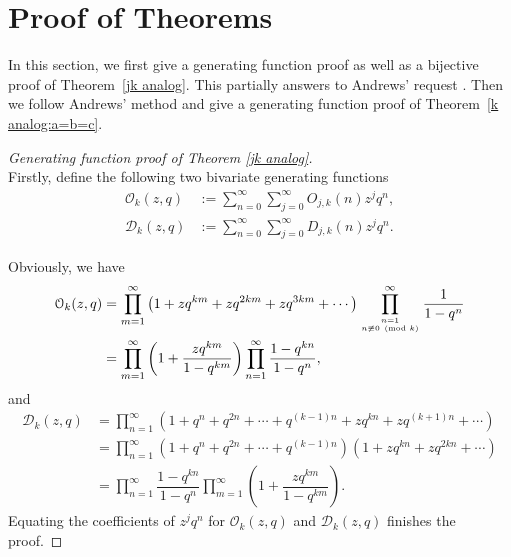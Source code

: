\documentclass[12pt]{amsart}
\numberwithin{equation}{section}
\theoremstyle{plain}
\theoremstyle{definition}
\begin{document}
\section{Proof of Theorems}
In this section, we first give a generating function proof as well as a bijective proof of Theorem~\ref{jk analog}. This partially answers to Andrews' request \cite{Andr2}. Then we follow Andrews' method and give a generating function proof of Theorem~\ref{k analog:a=b=c}.

\begin{proof}[Generating function proof of Theorem \ref{jk analog}]\ \\
Firstly, define the following two bivariate generating functions
\begin{align*}
\mathcal{O}_{k}(z,q) &:=\sum_{n=0}^{\infty}\sum_{j=0}^{\infty}O_{j,k}(n)z^{j}q^{n},\\
\mathcal{D}_{k}(z,q) &:=\sum_{n=0}^{\infty}\sum_{j=0}^{\infty}D_{j,k}(n)z^{j}q^{n}.
\end{align*}

Obviously, we have
\begin{align}
\mathcal{O}_{k}(z,q) &=\prod_{m=1}^{\infty}\left(1+zq^{km}+zq^{2km}+zq^{3km}+\cdots\right)\prod_{n=1\atop n\not\equiv0\pmod{k}}^{\infty}\dfrac{1}{1-q^{n}}\label{gene fun1}\\
 &=\prod_{m=1}^{\infty}\left(1+\dfrac{zq^{km}}{1-q^{km}}\right)\prod_{n=1}^{\infty}\dfrac{1-q^{kn}}{1-q^{n}},\nonumber
\end{align}
and
\begin{align}
\mathcal{D}_{k}(z,q) &=\prod_{n=1}^{\infty}\left(1+q^{n}+q^{2n}+\cdots+q^{(k-1)n}+zq^{kn}+zq^{(k+1)n}+\cdots\right)\label{gene fun2}\\
 &=\prod_{n=1}^{\infty}\left(1+q^{n}+q^{2n}+\cdots+q^{(k-1)n}\right)\left(1+zq^{kn}+zq^{2kn}+\cdots\right)\nonumber\\
 &=\prod_{n=1}^{\infty}\dfrac{1-q^{kn}}{1-q^{n}}\prod_{m=1}^{\infty}\left(1+\dfrac{zq^{km}}{1-q^{km}}\right).\nonumber
\end{align}
Equating the coefficients of $z^{j}q^{n}$ for $\mathcal{O}_{k}(z,q)$ and $\mathcal{D}_{k}(z,q)$ finishes the proof.
\end{proof}
\end{document}
